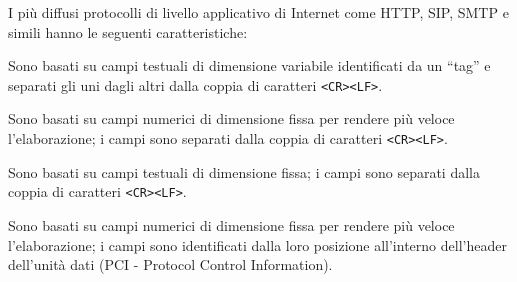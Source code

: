 \question
I più diffusi protocolli di livello applicativo di Internet come HTTP, SIP, SMTP e simili hanno le seguenti caratteristiche:

\begin{checkboxes}
	\CorrectChoice Sono basati su campi testuali di dimensione variabile identificati da un \enquote{tag} e separati gli uni dagli altri dalla coppia di caratteri \texttt{<CR><LF>}.

	\choice Sono basati su campi numerici di dimensione fissa per rendere più veloce l'elaborazione; i campi sono separati dalla coppia di caratteri \texttt{<CR><LF>}.

	\choice Sono basati su campi testuali di dimensione fissa; i campi sono separati dalla coppia di caratteri \texttt{<CR><LF>}.

	\choice Sono basati su campi numerici di dimensione fissa per rendere più veloce l'elaborazione; i campi sono identificati dalla loro posizione all'interno dell'header dell'unità dati (PCI - Protocol Control Information).
\end{checkboxes}
